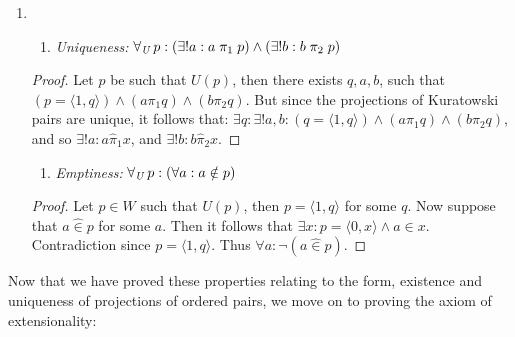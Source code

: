 \documentclass[11pt]{report}
\newcommand{\all}[1]{\forall_{\mathit{#1}}\hspace{0.5mm}}
\newcommand{\pleft}{\mathrel{\pi_1}}
\newcommand{\pright}{\mathrel{\pi_2}}
\newcommand{\pair}[2]{\langle #1,#2 \rangle}
\newcommand{\zin}{\mathrel{\widehat{\in}}}
\newcommand{\zpright}{\mathrel{\widehat{\pi}_2}}
\newcommand{\zpleft}{\mathrel{\widehat{\pi}_1}}
\theoremstyle{definition}
\theoremstyle{theorem}
\theoremstyle{lemma}
\begin{document}
\begin{enumerate}[series=axiomlist, label=\Roman*.]
\item \hspace{1mm}
  \begin{enumerate}[resume=sublist, label=(\roman*)]
  \item \textit{Uniqueness:} $\all{U} p: (\exists! a: a\pleft p) \wedge (\exists! b: b\pright p)$
  \end{enumerate}
    \begin{proof}
      Let $p$ be such that $U(p)$, then there exists $q,a,b$, such that $(p = \pair{1}{q}) \wedge (a\pleft q) \wedge (b\pright q)$.
      But since the projections of Kuratowski pairs are unique, it follows that:
      $\exists q: \exists! a, b:(q=\pair{1}{q})\wedge (a\pleft q) \wedge (b\pright q)$, and so $\exists! a: a\zpleft x$, and $\exists! b: b\zpright x$.
    \end{proof}
  \begin{enumerate}[resume=sublist, label=(\roman*)]
    \item \textit{Emptiness:} $\all{U} p:(\forall a: a\notin p)$
  \end{enumerate}
  \begin{proof}
    Let $p\in W$ such that $U(p)$, then $p = \pair{1}{q}$ for some $q$. Now suppose that $a\zin p$ for some $a$.
    Then it follows that $\exists x: p = \pair{0}{x} \wedge a\in x$.
    Contradiction since $p = \pair{1}{q}$. Thus $\forall a: \neg(a\zin p)$.
  \end{proof}
\end{enumerate}
Now that we have proved these properties relating to the form, existence and uniqueness of projections of ordered pairs, we move on to proving the axiom of extensionality:
\end{document}
